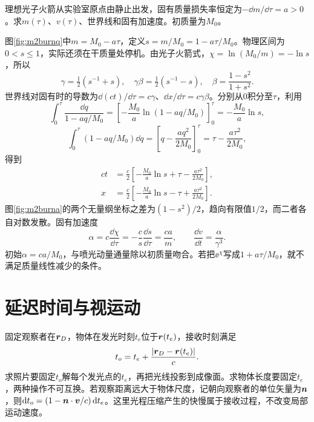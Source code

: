 \begin{example}\label{ex:m2burn}
理想光子火箭从实验室原点由静止出发，固有质量损失率恒定为$-\dd m/\dd\tau=a>0$。求$m(\tau)$、$v(\tau)$、世界线和固有加速度。初质量为$M_0$。
\end{example}
\begin{solution}
图\ref{fig:m2burnq}中$m=M_0-a\tau$，定义$s=m/M_0=1-a\tau/M_0$。物理区间为$0<s\leq1$，实际还须在干质量处停机。由光子火箭式，$\chi=\ln(M_0/m)=-\ln s$，所以
\[
 \gamma=\tfrac12(s^{-1}+s),\quad \gamma\beta=\tfrac12(s^{-1}-s),\quad
 \beta=\frac{1-s^2}{1+s^2}.
\]
世界线对固有时的导数为$\dd(ct)/\dd\tau=c\gamma$、$\dd x/\dd\tau=c\gamma\beta$。分别从0积分至$\tau$，利用
\[
 \int_0^\tau\frac{\dd q}{1-aq/M_0}
 =\left[-\frac{M_0}a\ln(1-aq/M_0)\right]_0^\tau
 =-\frac{M_0}a\ln s,
\]
\[
 \int_0^\tau(1-aq/M_0)\dd q
 =\left[q-\frac{aq^2}{2M_0}\right]_0^\tau
 =\tau-\frac{a\tau^2}{2M_0},
\]
得到
\begin{align*}
 ct&=\frac c2\left[-\frac{M_0}a\ln s+\tau-\frac{a\tau^2}{2M_0}\right],\\
 x&=\frac c2\left[-\frac{M_0}a\ln s-\tau+\frac{a\tau^2}{2M_0}\right].
\end{align*}
图\ref{fig:m2burna}的两个无量纲坐标之差为$(1-s^2)/2$，趋向有限值$1/2$，而二者各自对数发散。固有加速度
\[
 \alpha=c\frac{\dd\chi}{\dd\tau}
 =-\frac c s\frac{\dd s}{\dd\tau}=\frac{ca}{m},\qquad
 \frac{\dd v}{\dd t}=\frac{\alpha}{\gamma^3}.
\]
初始$\alpha=ca/M_0$，与喷光动量通量除以初质量吻合。若把$\ee^\chi$写成$1+a\tau/M_0$，就不满足质量线性减少的条件。
\end{solution}

\section{延迟时间与视运动}\label{th:m2retarded}
固定观察者在$\bm{r}_D$，物体在发光时刻$t_e$位于$\bm{r}(t_e)$，接收时刻满足
\begin{equation}\label{eq:m2retarded}
 t_o=t_e+\frac{|\bm{r}_D-\bm{r}(t_e)|}{c}.
\end{equation}
求照片要固定$t_o$解每个发光点的$t_e$，再把光线投影到成像面。求物体长度要固定$t_e$，两种操作不可互换。若观察距离远大于物体尺度，记朝向观察者的单位矢量为$\bm{n}$，则$\mathop{}\!\mathrm d t_o=(1-\bm{n}\cdot\bm{v}/c)\mathop{}\!\mathrm d t_e$。这里光程压缩产生的快慢属于接收过程，不改变局部运动速度。

